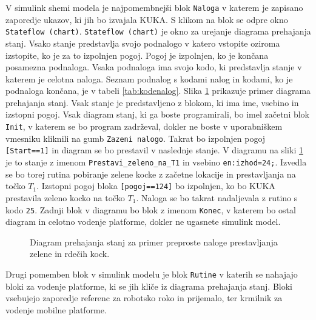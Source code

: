 V simulink shemi modela je najpomembnejši blok \verb"Naloga" v katerem je zapisano zaporedje ukazov, ki jih bo izvajala KUKA. S klikom na blok se odpre okno \verb"Stateflow (chart)". \verb"Stateflow (chart)" je okno za urejanje diagrama prehajanja stanj. Vsako stanje predstavlja svojo podnalogo v katero vstopite oziroma izstopite, ko je za to izpolnjen pogoj. Pogoj je izpolnjen, ko je končana posamezna podnaloga. Vsaka podnaloga ima svojo kodo, ki predstavlja stanje v katerem je celotna naloga. Seznam podnalog s kodami nalog in kodami, ko je podnaloga končana, je v tabeli \ref{tab:kodenalog}. Slika \ref{fig:stateflow1} prikazuje primer diagrama prehajanja stanj. Vsak stanje je predstavljeno z blokom, ki ima ime, vsebino in izstopni pogoj. Vsak diagram stanj, ki ga boste programirali, bo imel začetni blok \verb"Init", v katerem se bo program zadrževal, dokler ne boste v uporabniškem vmesniku kliknili na gumb \verb"Zazeni nalogo". Takrat bo izpolnjen pogoj \verb"[Start==1]" in diagram se bo prestavil v naslednje stanje. V diagramu na sliki \ref{fig:stateflow1} je to stanje z imenom \verb"Prestavi_zeleno_na_T1" in vsebino \verb"en:izhod=24;". Izvedla se bo torej rutina pobiranje zelene kocke z začetne lokacije in prestavljanja na točko $T_1$. Izstopni pogoj bloka \verb"[pogoj==124]" bo izpolnjen, ko bo KUKA prestavila zeleno kocko na točko $T_1$. Naloga se bo takrat nadaljevala z rutino s kodo \verb"25". Zadnji blok v diagramu bo blok z imenom \verb"Konec", v katerem bo ostal diagram in celotno vodenje platforme, dokler ne ugasnete simulink model.

\begin{figure}[h]
\centering {}
\caption{Diagram prehajanja stanj za primer preproste naloge prestavljanja zelene in rdečih kock.}
\label{fig:stateflow1}
\end{figure}

Drugi pomemben blok v simulink modelu je blok \verb"Rutine" v katerih se nahajajo bloki za vodenje platforme, ki se jih kliče iz diagrama prehajanja stanj. Bloki vsebujejo zaporedje referenc za robotsko roko in prijemalo, ter krmilnik za vodenje mobilne platforme.

\newpage

